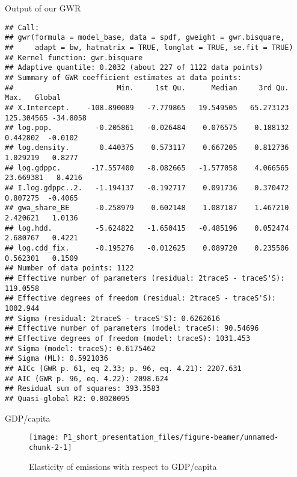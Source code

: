 \documentclass[
  ignorenonframetext,
]{beamer}
\begin{document}
\begin{frame}[fragile]{Output of our GWR}
\protect\hypertarget{output-of-our-gwr}{}

\tiny

\begin{verbatim}
## Call:
## gwr(formula = model_base, data = spdf, gweight = gwr.bisquare, 
##     adapt = bw, hatmatrix = TRUE, longlat = TRUE, se.fit = TRUE)
## Kernel function: gwr.bisquare 
## Adaptive quantile: 0.2032 (about 227 of 1122 data points)
## Summary of GWR coefficient estimates at data points:
##                        Min.     1st Qu.      Median     3rd Qu.        Max.   Global
## X.Intercept.    -108.890089   -7.779865   19.549505   65.273123  125.304565 -34.8058
## log.pop.          -0.205861   -0.026484    0.076575    0.188132    0.442802  -0.0102
## log.density.       0.440375    0.573117    0.667205    0.812736    1.029219   0.8277
## log.gdppc.       -17.557400   -8.082665   -1.577058    4.066565   23.669381   8.4216
## I.log.gdppc..2.   -1.194137   -0.192717    0.091736    0.370472    0.807275  -0.4065
## gwa_share_BE      -0.258979    0.602148    1.087187    1.467210    2.420621   1.0136
## log.hdd.          -5.624822   -1.650415   -0.485196    0.052474    2.680767   0.4221
## log.cdd_fix.      -0.195276   -0.012625    0.089720    0.235506    0.562301   0.1509
## Number of data points: 1122 
## Effective number of parameters (residual: 2traceS - traceS'S): 119.0558 
## Effective degrees of freedom (residual: 2traceS - traceS'S): 1002.944 
## Sigma (residual: 2traceS - traceS'S): 0.6262616 
## Effective number of parameters (model: traceS): 90.54696 
## Effective degrees of freedom (model: traceS): 1031.453 
## Sigma (model: traceS): 0.6175462 
## Sigma (ML): 0.5921036 
## AICc (GWR p. 61, eq 2.33; p. 96, eq. 4.21): 2207.631 
## AIC (GWR p. 96, eq. 4.22): 2098.624 
## Residual sum of squares: 393.3583 
## Quasi-global R2: 0.8020095
\end{verbatim}

\end{frame}

\begin{frame}{GDP/capita}
\protect\hypertarget{gdpcapita}{}

\begin{figure}

{\centering \texttt{[image: P1\_short\_presentation\_files/figure-beamer/unnamed-chunk-2-1]} 

}

\caption{Elasticity of emissions with respect to GDP/capita}\label{fig:unnamed-chunk-2}
\end{figure}

\end{frame}
\end{document}
